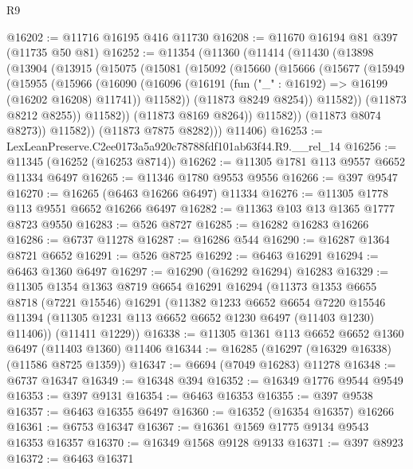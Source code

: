 \begin{lexlean}{R9}
\begin{coremodule}
@16202 := @11716 @16195 @416 @11730
@16208 := @11670 @16194 @81 @397 (@11735 @50 @81)
@16252 := @11354
    (@11360
      (@11414
        (@11430
          (@13898
            (@13904
              (@13915
                (@15075
                  (@15081
                    (@15092
                      (@15660
                        (@15666
                          (@15677
                            (@15949
                              (@15955
                                (@15966
                                  (@16090
                                    (@16096
                                      (@16191 (fun ("_" : @16192) => @16199 (@16202 @16208) @11741))
                                      @11582))
                                  (@11873 @8249 @8254))
                                @11582))
                            (@11873 @8212 @8255))
                          @11582))
                      (@11873 @8169 @8264))
                    @11582))
                (@11873 @8074 @8273))
              @11582))
          (@11873 @7875 @8282)))
      @11406)
@16253 := LexLeanPreserve.C2ee0173a5a920c78788fdf101ab63f44.R9.__rel_14
@16256 := @11345 (@16252 (@16253 @8714))
@16262 := @11305 @1781 @113 @9557 @6652 @11334 @6497
@16265 := @11346 @1780 @9553 @9556
@16266 := @397 @9547
@16270 := @16265 (@6463 @16266 @6497) @11334
@16276 := @11305 @1778 @113 @9551 @6652 @16266 @6497
@16282 := @11363 @103 @13 @1365 @1777 @8723 @9550
@16283 := @526 @8727
@16285 := @16282 @16283 @16266
@16286 := @6737 @11278
@16287 := @16286 @544
@16290 := @16287 @1364 @8721 @6652
@16291 := @526 @8725
@16292 := @6463 @16291
@16294 := @6463 @1360 @6497
@16297 := @16290 (@16292 @16294) @16283
@16329 := @11305
    @1354
    @1363
    @8719
    @6654
    @16291
    @16294
    (@11373
      @1353
      @6655
      @8718
      (@7221 @15546)
      @16291
      (@11382
        @1233
        @6652
        @6654
        @7220
        @15546
        @11394
        (@11305 @1231 @113 @6652 @6652 @1230 @6497 (@11403 @1230) @11406))
      (@11411 @1229))
@16338 := @11305 @1361 @113 @6652 @6652 @1360 @6497 (@11403 @1360) @11406
@16344 := @16285 (@16297 (@16329 @16338) (@11586 @8725 @1359))
@16347 := @6694 (@7049 @16283) @11278
@16348 := @6737 @16347
@16349 := @16348 @394
@16352 := @16349 @1776 @9544 @9549
@16353 := @397 @9131
@16354 := @6463 @16353
@16355 := @397 @9538
@16357 := @6463 @16355 @6497
@16360 := @16352 (@16354 @16357) @16266
@16361 := @6753 @16347
@16367 := @16361 @1569 @1775 @9134 @9543 @16353 @16357
@16370 := @16349 @1568 @9128 @9133
@16371 := @397 @8923
@16372 := @6463 @16371

\end{coremodule}
\end{lexlean}
